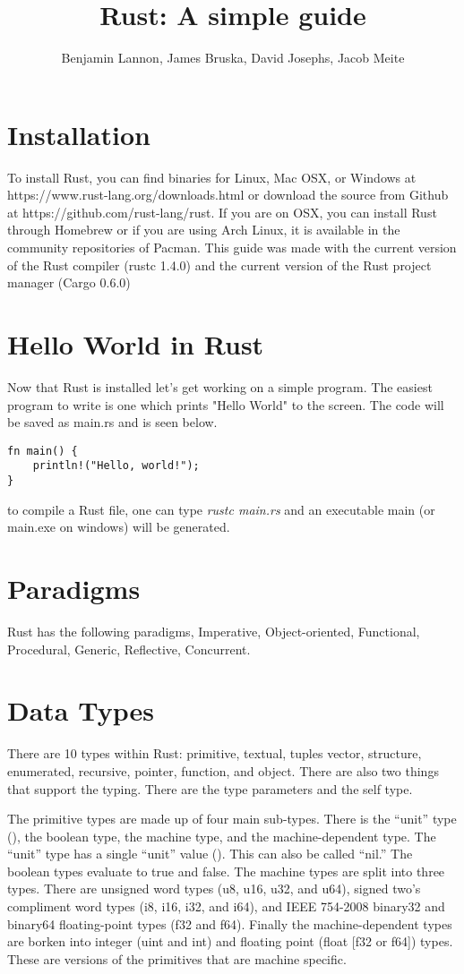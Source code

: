 \documentclass{article}
\title{Rust: A simple guide}
\author{Benjamin Lannon, James Bruska, David Josephs, Jacob Meite}
\begin{document}
\maketitle
\tableofcontents

\section{Installation}
To install Rust, you can find binaries for Linux, Mac OSX, or Windows at https://www.rust-lang.org/downloads.html or download the source from Github at https://github.com/rust-lang/rust. If you are on OSX, you can install Rust through Homebrew or if you are using Arch Linux, it is available in the community repositories of Pacman. This guide was made with the current version of the Rust compiler (rustc 1.4.0) and the current version of the Rust project manager (Cargo 0.6.0)

\section{Hello World in Rust}
Now that Rust is installed let's get working on a simple program. The easiest program to write is one which prints "Hello World" to the screen. The code will be saved as main.rs and is seen below.
\begin{lstlisting}
fn main() {
	println!("Hello, world!");
}
\end{lstlisting}

to compile a Rust file, one can type \emph{rustc main.rs} and an executable main (or main.exe on windows) will be generated.

\section{Paradigms}
Rust has the following paradigms, Imperative, Object-oriented, Functional, Procedural, Generic, Reflective, Concurrent.

\section{Data Types}
There are 10 types within Rust: primitive, textual, tuples vector, structure, enumerated, recursive, pointer, function, and object. There are also two things that support the typing. There are the type parameters and the self type.

The primitive types are made up of four main sub-types. There is the “unit” type (), the boolean type, the machine type, and the machine-dependent type. The “unit” type has a single “unit” value (). This can also be called “nil.” The boolean types evaluate to true and false. The machine types are split into three types. There are unsigned word types (u8, u16, u32, and u64), signed two's compliment word types (i8, i16, i32, and i64), and IEEE 754-2008 binary32 and binary64 floating-point types (f32 and f64). Finally the machine-dependent types are borken into integer (uint and int) and floating point (float [f32 or f64]) types. These are versions of the primitives that are machine specific. 
\end{document}

